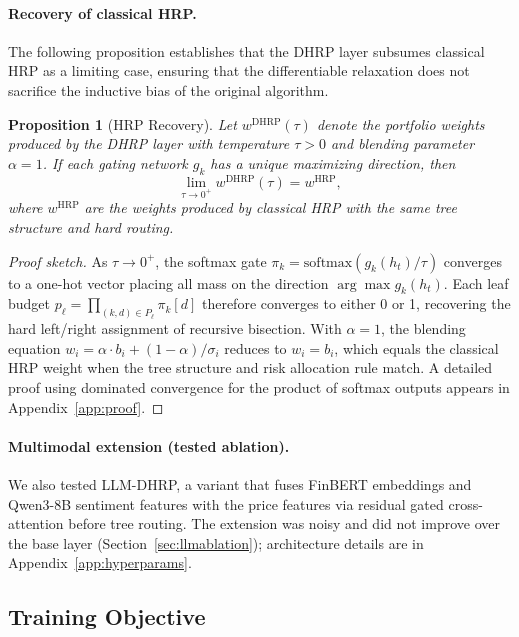 \documentclass{article}
\newtheorem{proposition}{Proposition}
\begin{document}
\paragraph{Recovery of classical HRP.} The following proposition establishes that the DHRP layer subsumes classical HRP as a limiting case, ensuring that the differentiable relaxation does not sacrifice the inductive bias of the original algorithm.

\begin{proposition}[HRP Recovery]
\label{prop:recovery}
Let $w^{\text{DHRP}}(\tau)$ denote the portfolio weights produced by the DHRP layer with temperature $\tau > 0$ and blending parameter $\alpha = 1$. If each gating network $g_k$ has a unique maximizing direction, then
\begin{equation}
\lim_{\tau \to 0^+} w^{\text{DHRP}}(\tau) = w^{\text{HRP}},
\end{equation}
where $w^{\text{HRP}}$ are the weights produced by classical HRP with the same tree structure and hard routing.
\end{proposition}

\begin{proof}[Proof sketch]
As $\tau \to 0^+$, the softmax gate $\pi_k = \text{softmax}(g_k(h_t)/\tau)$ converges to a one-hot vector placing all mass on the direction $\arg\max g_k(h_t)$. Each leaf budget $p_\ell = \prod_{(k,d) \in P_\ell} \pi_k[d]$ therefore converges to either 0 or 1, recovering the hard left/right assignment of recursive bisection. With $\alpha = 1$, the blending equation $w_i = \alpha \cdot b_i + (1-\alpha)/\sigma_i$ reduces to $w_i = b_i$, which equals the classical HRP weight when the tree structure and risk allocation rule match. A detailed proof using dominated convergence for the product of softmax outputs appears in Appendix~\ref{app:proof}.
\end{proof}

\paragraph{Multimodal extension (tested ablation).} We also tested LLM-DHRP, a variant that fuses FinBERT \citep{Huang2023} embeddings and Qwen3-8B \citep{Qwen2025} sentiment features with the price features via residual gated cross-attention before tree routing. The extension was noisy and did not improve over the base layer (Section~\ref{sec:llmablation}); architecture details are in Appendix~\ref{app:hyperparams}.

\subsection{Training Objective}
\end{document}
